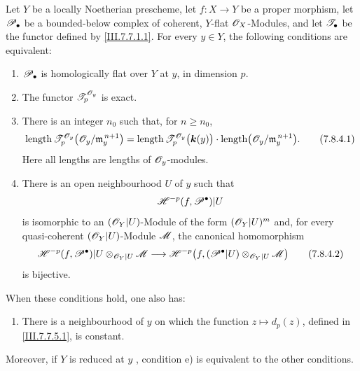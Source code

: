 \begin{proposition}[7.8.4]
\label{III.7.8.4}
Let $Y$ be a locally Noetherian prescheme, let
$f:X\to Y$ be a proper morphism, let $\mathscr{P}_\bullet$ be a
bounded-below complex of coherent, $Y$-flat
$\mathscr{O}_X$-Modules, and let $\mathscr{T}_\bullet$ be the functor
defined by \eqref{III.7.7.1.1}.  For every $y\in Y$, the
following conditions are equivalent:
\begin{enumerate}
  \item[a)] $\mathscr{P}_\bullet$ is homologically flat over $Y$
  at $y$, in dimension $p$.
  \item[b)] The functor $\mathscr{T}_p^{\mathscr{O}_y}$ is exact.
  \item[c)] There is an integer $n_0$ such that, for
  $n\geq n_0$,
  \[
    \operatorname{length}
      \mathscr{T}_p^{\mathscr{O}_y}
        \bigl(\mathscr{O}_y/\mathfrak m_y^{\,n+1}\bigr)
    =
    \operatorname{length}
      \mathscr{T}_p^{\mathscr{O}_y}\bigl(\boldsymbol{k}(y)\bigr)
    \cdot
    \operatorname{length}
      \bigl(\mathscr{O}_y/\mathfrak m_y^{\,n+1}\bigr).
    \tag{7.8.4.1}\label{III.7.8.4.1}
  \]
  Here all lengths are lengths of $\mathscr{O}_y$-modules.
  \item[d)] There is an open neighbourhood $U$ of $y$ such
  that
  \[
    \mathscr{H}^{-p}(f,\mathscr{P}^\bullet)|U
  \]
  is isomorphic to an $(\mathscr{O}_Y|U)$-Module of the form
  $(\mathscr{O}_Y|U)^m$ and, for every quasi-coherent
  $(\mathscr{O}_Y|U)$-Module $\mathscr{M}$, the canonical
  homomorphism
  \[
    \mathscr{H}^{-p}(f,\mathscr{P}^\bullet)|U
      \otimes_{\mathscr{O}_Y|U}\mathscr{M}
    \longrightarrow
    \mathscr{H}^{-p}
      \bigl(f,(\mathscr{P}^\bullet|U)
        \otimes_{\mathscr{O}_Y|U}\mathscr{M}\bigr)
    \tag{7.8.4.2}\label{III.7.8.4.2}
  \]
  is bijective.
\end{enumerate}
When these conditions hold, one also has:
\begin{enumerate}
  \item[e)] There is a neighbourhood of $y$ on which the
  function $z\mapsto d_p(z)$, defined in
  \eqref{III.7.7.5.1}, is constant.
\end{enumerate}
Moreover, if $Y$ is reduced at $y$ ,
condition e) is equivalent to the other conditions.
\end{proposition}

